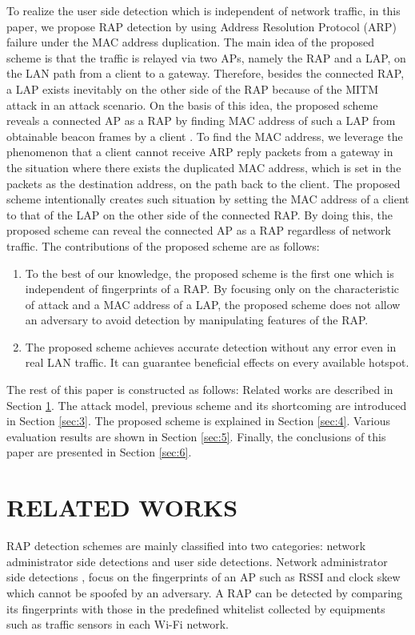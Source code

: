 \documentclass[conference]{IEEEtran}
\begin{document}
To realize the user side detection which is independent of network traffic, in this paper, we propose RAP detection by using Address Resolution Protocol (ARP) failure under the MAC address duplication.
The main idea of the proposed scheme is that the traffic is relayed via two APs, namely the RAP and a LAP, on the LAN path from a client to a gateway.
Therefore, besides the connected RAP, a LAP exists inevitably on the other side of the RAP because of the MITM attack in an attack scenario.
On the basis of this idea, the proposed scheme reveals a connected AP as a RAP by finding MAC address of such a LAP from obtainable beacon frames by a client \cite{beacon}.
To find the MAC address, we leverage the phenomenon that a client cannot receive ARP reply packets from a gateway in the situation where there exists the duplicated MAC address, which is set in the packets as the destination address, on the path back to the client.
The proposed scheme intentionally creates such situation by setting the MAC address of a client to that of the LAP on the other side of the connected RAP.
By doing this, the proposed scheme can reveal the connected AP as a RAP regardless of network traffic.
The contributions of the proposed scheme are as follows:
\begin{enumerate}
    \renewcommand{\labelenumi}{\arabic{enumi}).}
    \item To the best of our knowledge, the proposed scheme is the first one which is independent of fingerprints of a RAP. By focusing only on the characteristic of attack and a MAC address of a LAP, the proposed scheme does not allow an adversary to avoid detection by manipulating features of the RAP.
    \item The proposed scheme achieves accurate detection without any error even in real LAN traffic. It can guarantee beneficial effects on every available hotspot.
\end{enumerate}
The rest of this paper is constructed as follows: Related works are described in Section \ref{sec:2}.
The attack model, previous scheme and its shortcoming are introduced in Section \ref{sec:3}.
The proposed scheme is explained in Section \ref{sec:4}.
Various evaluation results are shown in Section \ref{sec:5}.
Finally, the conclusions of this paper are presented in Section \ref{sec:6}.

\section{RELATED WORKS}\label{sec:2}
RAP detection schemes are mainly classified into two categories: network administrator side detections and user side detections.
Network administrator side detections \cite{prapd}, \cite{clockskew} focus on the fingerprints of an AP such as RSSI and clock skew which cannot be spoofed by an adversary.
A RAP can be detected by comparing its fingerprints with those in the predefined whitelist collected by equipments such as traffic sensors in each Wi-Fi network.
\end{document}
